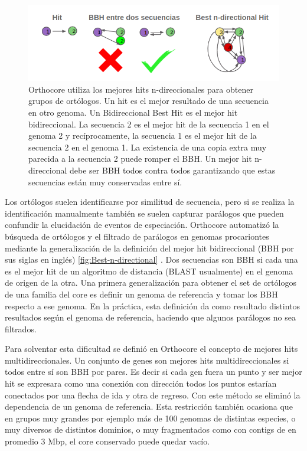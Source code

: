 \documentclass[12pt,twoside]{reedthesis}
\begin{document}
  \begin{figure}[h!tbp]
  \centering
  \includegraphics[angle = 0,scale = .55]{chapter1/Best-n-directional.png}
  \caption[Los mejores hits n-direccionales generalizan a los $Bidirectional~Best~Hits$]{\footnotesize{Orthocore utiliza los mejores hits n-direccionales para obtener grupos de ortólogos. Un hit es el mejor resultado de una secuencia en otro genoma. Un Bidireccional Best Hit es el mejor hit bidireccional. La secuencia 2 es el mejor hit de la secuencia 1 en el genoma 2 y recíprocamente, la secuencia 1 es el mejor hit de la secuencia 2 en el genoma 1. La existencia de una copia extra muy parecida a la secuencia 2 puede romper el BBH. Un mejor hit n-direccional debe ser BBH todos contra todos garantizando que estas secuencias están muy conservadas entre sí.}}
  \label{fig:Best-n-directional}
  \end{figure}
  
  Los ortólogos suelen identificarse por similitud de secuencia, pero si
  se realiza la identificación manualmente también se suelen capturar
  parálogos que pueden confundir la elucidación de eventos de especiación.
  Orthocore automatizó la búsqueda de ortólogos y el filtrado de parálogos
  en genomas procariontes mediante la generalización de la definición del
  mejor hit bidireccional (BBH por sus siglas en inglés)
  \autoref{fig:Best-n-directional} . Dos secuencias son BBH si cada una es
  el mejor hit de un algoritmo de distancia (BLAST usualmente) en el
  genoma de origen de la otra. Una primera generalización para obtener el
  set de ortólogos de una familia del core es definir un genoma de
  referencia y tomar los BBH respecto a ese genoma. En la práctica, esta
  definición da como resultado distintos resultados según el genoma de
  referencia, haciendo que algunos parálogos no sea filtrados.
  
  Para solventar esta dificultad se definió en Orthocore el concepto de
  mejores hits multidireccionales. Un conjunto de genes son mejores hits
  multidireccionales si todos entre sí son BBH por pares. Es decir si cada
  gen fuera un punto y ser mejor hit se expresara como una conexión con
  dirección todos los puntos estarían conectados por una flecha de ida y
  otra de regreso. Con este método se eliminó la dependencia de un genoma
  de referencia. Esta restricción también ocasiona que en grupos muy
  grandes por ejemplo más de 100 genomas de distintas especies, o muy
  diversos de distintos dominios, o muy fragmentados como con contigs de
  en promedio 3 Mbp, el core conservado puede quedar vacío.
  
\end{document}
